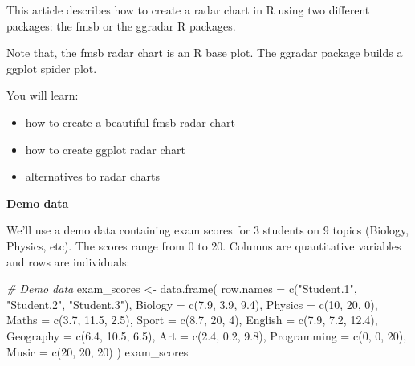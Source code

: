 \documentclass[
]{article}
\newenvironment{Shaded}{\begin{snugshade}}{\end{snugshade}}
\newcommand{\AttributeTok}[1]{\textcolor[rgb]{0.77,0.63,0.00}{#1}}
\newcommand{\CommentTok}[1]{\textcolor[rgb]{0.56,0.35,0.01}{\textit{#1}}}
\newcommand{\DecValTok}[1]{\textcolor[rgb]{0.00,0.00,0.81}{#1}}
\newcommand{\FloatTok}[1]{\textcolor[rgb]{0.00,0.00,0.81}{#1}}
\newcommand{\FunctionTok}[1]{\textcolor[rgb]{0.00,0.00,0.00}{#1}}
\newcommand{\NormalTok}[1]{#1}
\newcommand{\OtherTok}[1]{\textcolor[rgb]{0.56,0.35,0.01}{#1}}
\newcommand{\StringTok}[1]{\textcolor[rgb]{0.31,0.60,0.02}{#1}}
\providecommand{\tightlist}{%
  \setlength{\itemsep}{0pt}\setlength{\parskip}{0pt}}
\begin{document}
This article describes how to create a radar chart in R using two
different packages: the fmsb or the ggradar R packages.

Note that, the fmsb radar chart is an R base plot. The ggradar package
builds a ggplot spider plot.

You will learn:

\begin{itemize}
\tightlist
\item
  how to create a beautiful fmsb radar chart
\item
  how to create ggplot radar chart
\item
  alternatives to radar charts
\end{itemize}

\textbf{Demo data}

We'll use a demo data containing exam scores for 3 students on 9 topics
(Biology, Physics, etc). The scores range from 0 to 20. Columns are
quantitative variables and rows are individuals:

\begin{Shaded}
\begin{Highlighting}[]
\CommentTok{\# Demo data}
\NormalTok{exam\_scores }\OtherTok{\textless{}{-}} \FunctionTok{data.frame}\NormalTok{(}
  \AttributeTok{row.names =} \FunctionTok{c}\NormalTok{(}\StringTok{"Student.1"}\NormalTok{, }\StringTok{"Student.2"}\NormalTok{, }\StringTok{"Student.3"}\NormalTok{),}
  \AttributeTok{Biology =} \FunctionTok{c}\NormalTok{(}\FloatTok{7.9}\NormalTok{, }\FloatTok{3.9}\NormalTok{, }\FloatTok{9.4}\NormalTok{),}
  \AttributeTok{Physics =} \FunctionTok{c}\NormalTok{(}\DecValTok{10}\NormalTok{, }\DecValTok{20}\NormalTok{, }\DecValTok{0}\NormalTok{),}
  \AttributeTok{Maths =} \FunctionTok{c}\NormalTok{(}\FloatTok{3.7}\NormalTok{, }\FloatTok{11.5}\NormalTok{, }\FloatTok{2.5}\NormalTok{),}
  \AttributeTok{Sport =} \FunctionTok{c}\NormalTok{(}\FloatTok{8.7}\NormalTok{, }\DecValTok{20}\NormalTok{, }\DecValTok{4}\NormalTok{),}
  \AttributeTok{English =} \FunctionTok{c}\NormalTok{(}\FloatTok{7.9}\NormalTok{, }\FloatTok{7.2}\NormalTok{, }\FloatTok{12.4}\NormalTok{),}
  \AttributeTok{Geography =} \FunctionTok{c}\NormalTok{(}\FloatTok{6.4}\NormalTok{, }\FloatTok{10.5}\NormalTok{, }\FloatTok{6.5}\NormalTok{),}
  \AttributeTok{Art =} \FunctionTok{c}\NormalTok{(}\FloatTok{2.4}\NormalTok{, }\FloatTok{0.2}\NormalTok{, }\FloatTok{9.8}\NormalTok{),}
  \AttributeTok{Programming =} \FunctionTok{c}\NormalTok{(}\DecValTok{0}\NormalTok{, }\DecValTok{0}\NormalTok{, }\DecValTok{20}\NormalTok{),}
  \AttributeTok{Music =} \FunctionTok{c}\NormalTok{(}\DecValTok{20}\NormalTok{, }\DecValTok{20}\NormalTok{, }\DecValTok{20}\NormalTok{)}
\NormalTok{)}
\NormalTok{exam\_scores}
\end{Highlighting}
\end{Shaded}
\end{document}

